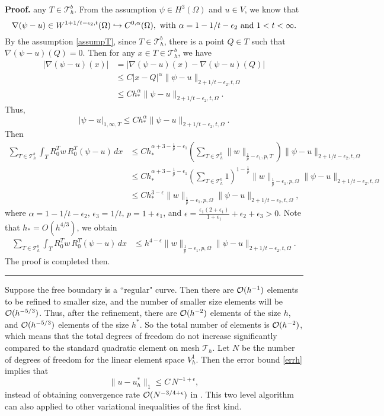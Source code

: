 \documentclass[12pt]{article}
\newenvironment{proof}[1][Proof]{\textbf{#1.} }
{\ \rule{0.75em}{0.75em}\smallskip}
\begin{document}
\begin{proof}
any $T\in \mathcal{T}_h^b$.  From the assumption
$\psi \in H^3(\Omega)$ and $u\in V$, we know that 
\[\nabla(\psi-u) \in W^{1+1/t-\epsilon_2,t}(\Omega)
\hookrightarrow C^{0,\alpha}(\Omega),\ {\rm with}\ \alpha = 1-1/t-\epsilon_2 \ {\rm and}\ 1<t<\infty.\] 
By the assumption \eqref{assumpT}, since $T \in \mathcal{T}_h^b$, there is 
a point $Q\in T$ such that $\nabla(\psi -u)(Q) = 0$. Then for any $x\in T\in \mathcal{T}_h^b$, 
we have
\begin{align*}
|\nabla(\psi-u)(x)|& =|\nabla(\psi-u)(x)-\nabla(\psi - u)(Q)|\\
  &\leq  C |x-Q|^\alpha\|\psi-u\|_{2+1/t-\epsilon_2,t,\Omega} \\
  &\leq C h_*^\alpha\|\psi-u\|_{2+1/t-\epsilon_2,t,\Omega}. 
\end{align*}
Thus,
\[ |\psi -u|_{1,\infty,T}\leq C h_*^\alpha \|\psi-u\|_{2+1/t-\epsilon_2,t,\Omega}.\]
Then
\begin{align*}
\sum_{T\in \mathcal{T}_h^b}  \int_T R^T_0 w \, R^T_0(\psi - u) \,dx 
&\leq C h_*^{\alpha+3-\frac{1}{p}-\epsilon_1}
\left(\sum_{T\in \mathcal{T}_h^b}\|w\|_{\frac{1}{p}-\epsilon_1,p,T}\right) \|\psi-u\|_{2+1/t-\epsilon_2,t,\Omega}\\
&\leq  C h_*^{\alpha+3-\frac{1}{p}-\epsilon_1} \left(\sum_{T\in \mathcal{T}_h^b} 1\right)^{1-\frac{1}{p}} 
 \|w\|_{\frac{1}{p}-\epsilon_1,p,\Omega} \|\psi-u\|_{2+1/t-\epsilon_2,t,\Omega} \\
&\leq C h_*^{3-\epsilon} \|w\|_{\frac{1}{p}-\epsilon_1,p,\Omega} \|\psi-u\|_{2+1/t-\epsilon_2,t,\Omega} ,
\end{align*}
where $\alpha = 1-1/t-\epsilon_2$, $\epsilon_3 = 1/t$, $p=1+\epsilon_1$, and 
$\epsilon=\frac{\epsilon_1(2+\epsilon_1)}{1+\epsilon_1} + \epsilon_2+ \epsilon_3>0$.
Note that $h_*=O(h^{4/3})$, we obtain
\begin{align*}
\sum_{T\in \mathcal{T}_h^b}  \int_T R^T_0 w \, R^T_0(\psi - u) \,dx 
&\leq h^{4-\epsilon} \|w\|_{\frac{1}{p}-\epsilon_1,p,\Omega} \|\psi-u\|_{2+1/t-\epsilon_2,t,\Omega} .
\end{align*}
The proof is completed then.
\end{proof}

Suppose the free boundary is a ``regular" curve.  Then there are ${\cal O}(h^{-1})$
elements to be refined to smaller size, and the number of smaller size elements
will be ${\cal O}(h^{-5/3})$.  Thus, after the refinement, there are ${\cal O}(h^{-2})$ 
elements of the size $h$, and ${\cal O}(h^{-5/3})$ elements of the size $h^*$.
So the total number of elements is ${\cal O}(h^{-2})$, which means that the total degrees of
freedom do not increase significantly compared to the standard quadratic element on mesh 
$\mathcal{T}_h$. Let $N$ be the number of degrees of freedom for the linear element 
space $V_h^1$.  Then the error bound \eqref{errh} implies that
\[ \|u-u_h^*\|_1 \leq C \, N^{-1+\epsilon}, \]
instead of obtaining convergence rate ${\cal O}(N^{-3/4+\epsilon})$ in \cite{wang02}. This two level
algorithm can also applied to other variational inequalities of the first kind.
\end{document}
